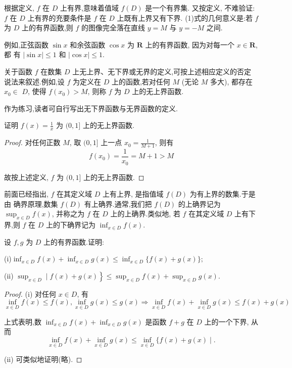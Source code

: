 根据定义, $f$ 在 $D$ 上有界,意味着值域 $f(D)$ 是一个有界集. 又按定义, 不难验证: $f$ 在 $D$ 上有界的充要条件是 $f$ 在 $D$ 上既有上界又有下界. (1)式的几何意义是:若 $f$ 为 $D$ 上的有界函数,则 $f$ 的图像完全落在直线 $y=M$ 与 $y=-M$ 之间.

例如,正弦函数 $\sin x$ 和余弦函数 $\cos x$ 为 $\mathbf{R}$ 上的有界函数, 因为对每一个 $x \in \mathbf{R}$, 都 有 $|\sin x| \leqslant 1$ 和 $|\cos x| \leqslant 1$.

关于函数 $f$ 在数集 $D$ 上无上界、无下界或无界的定义,可按上述相应定义的否定 说法来叙述.例如,设 $f$ 为定义在 $D$ 上的函数,若对任何 $M$ (无论 $M$ 多大), 都存在 $x_{0} \in$ $D$, 使得 $f\left(x_{0}\right)>M$, 则称 $f$ 为 $D$ 上的无上界函数.

作为练习,读者可自行写出无下界函数与无界函数的定义.

\begin{example}
	证明 $f(x)=\frac{1}{x}$ 为 $(0,1]$ 上的无上界函数.
\end{example}


\begin{proof}
	对任何正数 $M$, 取 $(0,1]$ 上一点 $x_{0}=\frac{1}{M+1}$, 则有
	\[
	f\left(x_{0}\right)=\frac{1}{x_{0}}=M+1>M
	\]

	故按上述定义, $f$ 为 $(0,1]$ 上的无上界函数.
\end{proof}

前面已经指出, $f$ 在其定义域 $D$ 上有上界, 是指值域 $f(D)$ 为有上界的数集.于是由 确界原理,数集 $f(D)$ 有上确界.通常,我们把 $f(D)$ 的上确界记为 $\sup _{x \in D} f(x)$, 并称之为 $f$ 在 $D$ 上的上确界.类似地, 若 $f$ 在其定义域 $D$ 上有下界,则 $f$ 在 $D$ 上的下确界记为 $\inf _{x \in D} f(x).$

\begin{example}
	设 $f, g$ 为 $D$ 上的有界函数.证明:

	(i)$ \inf _{x \in D} f(x)+\inf _{x \in D} g(x) \leqslant \inf _{x \in D}\{f(x)+g(x)\} ;$

	(ii) $ \left.\sup _{x \in D} \mid f(x)+g(x)\right\} \leqslant \sup _{x \in D} f(x)+\sup _{x \in D} g(x) .$
\end{example}

\begin{proof}
	(i) 对任何 $x \in D$, 有
	\[
	\inf _{x \in D} f(x) \leqslant f(x), \inf _{x \in D} g(x) \leqslant g(x) \Rightarrow \inf _{x \in D} f(x)+\inf _{x \in D} g(x) \leqslant f(x)+g(x)
	\]

	上式表明,数 $ \inf _{x \in D} f(x)+\inf _{x \in D} g(x) $ 是函数 $ f+g $ 在 $ D $ 上的一个下界, 从而
	\[
	\inf _{x \in D} f(x)+\inf _{x \in D} g(x) \leqslant \inf _{x \in D}\{f(x)+g(x) \mid .
	\]

	(ii) 可类似地证明(略).
\end{proof}

